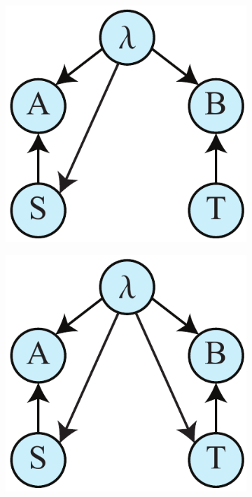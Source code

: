 \documentclass[12pt,onecolumn,nofootinbib]{revtex4-2}
\begin{document}
\begin{figure}[h]
        \begin{subfigure}[b]{0.18\textwidth}
                	\centering
        		\includegraphics[width=\textwidth]{superdet-1}
		\subcaption{}
		\label{fig:superdeta}
	\end{subfigure}
	\hspace{5em}
        \begin{subfigure}[b]{0.18\textwidth}
                	\centering
        	\includegraphics[width=\textwidth]{superdet}

\end{subfigure}
\end{figure}
\end{document}
